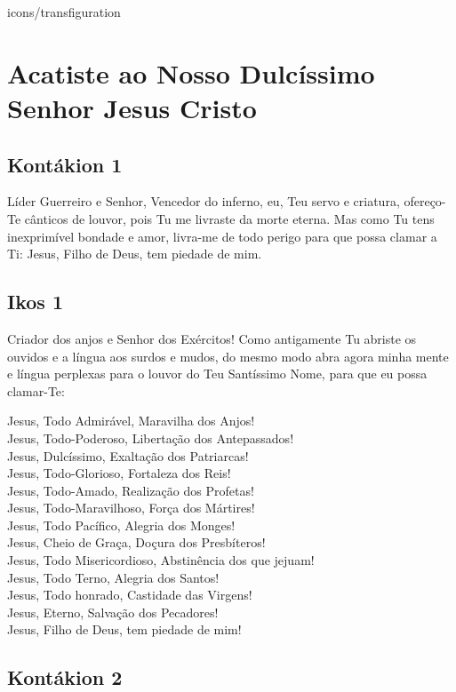 \documentclass{subfiles}
\begin{document}
\begin{chapterimg}[width=\textwidth]{icons/transfiguration}
    \chapter{Acatiste ao Nosso Dulcíssimo Senhor Jesus Cristo}
\end{chapterimg}

\section*{Kontákion 1}

Líder Guerreiro e Senhor, Vencedor do inferno, eu, Teu servo e
criatura, ofereço-Te cânticos de louvor, pois Tu me livraste da morte eterna.
Mas como Tu tens inexprimível bondade e amor, livra-me de todo perigo para
que possa clamar a Ti: Jesus, Filho de Deus, tem piedade de mim.

\section*{Ikos 1}

Criador dos anjos e Senhor dos Exércitos! Como antigamente Tu
abriste os ouvidos e a língua aos surdos e mudos, do mesmo modo abra agora
minha mente e língua perplexas para o louvor do Teu Santíssimo Nome, para
que eu possa clamar-Te:

Jesus, Todo Admirável, Maravilha dos Anjos! \\
Jesus, Todo-Poderoso, Libertação dos Antepassados! \\
Jesus, Dulcíssimo, Exaltação dos Patriarcas! \\
Jesus, Todo-Glorioso, Fortaleza dos Reis! \\
Jesus, Todo-Amado, Realização dos Profetas! \\
Jesus, Todo-Maravilhoso, Força dos Mártires! \\
Jesus, Todo Pacífico, Alegria dos Monges! \\
Jesus, Cheio de Graça, Doçura dos Presbíteros! \\
Jesus, Todo Misericordioso, Abstinência dos que jejuam! \\
Jesus, Todo Terno, Alegria dos Santos! \\
Jesus, Todo honrado, Castidade das Virgens! \\
Jesus, Eterno, Salvação dos Pecadores! \\
Jesus, Filho de Deus, tem piedade de mim!

\section*{Kontákion 2}
\end{document}
